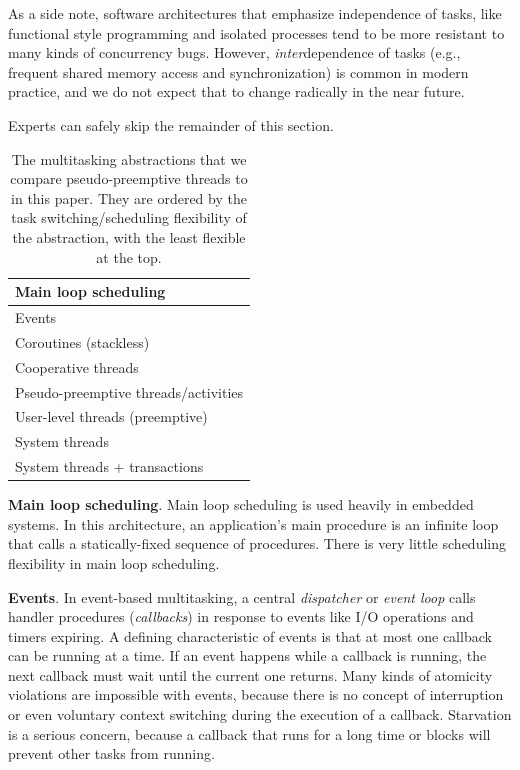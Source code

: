 \documentclass[9pt,preprint]{sigplanconf-2}
\begin{document}
As a side note, software architectures that emphasize independence of tasks, like functional style programming and isolated processes tend to be more resistant to many kinds of concurrency bugs.
However, \emph{inter}dependence of tasks (e.g., frequent shared memory access and synchronization) is common in modern practice, and we do not expect that to change radically in the near future.

Experts can safely skip the remainder of this section.

\begin{table}
  \centering
  \begin{tabular}{|l|}
    \hline
    Main loop scheduling \\
    \hline
    Events \\
    \hline
    Coroutines (stackless) \\
    \hline
    Cooperative threads \\
    \hline
    Pseudo-preemptive threads/activities \\
    \hline
    User-level threads (preemptive) \\
    \hline
    System threads \\
    \hline
    System threads + transactions \\
    \hline
  \end{tabular}
  \caption{The multitasking abstractions that we compare pseudo-preemptive threads to in this paper.
  They are ordered by the task switching/scheduling flexibility of the abstraction, with the least flexible at the top.}
  \label{table:abstractions}
\end{table}

\textbf{Main loop scheduling}.
Main loop scheduling is used heavily in embedded systems.
In this architecture, an application's main procedure is an infinite loop that calls a statically-fixed sequence of procedures.
There is very little scheduling flexibility in main loop scheduling.

\textbf{Events}.
In event-based multitasking, a central \emph{dispatcher} or \emph{event loop} calls handler procedures (\emph{callbacks}) in response to events like I/O operations and timers expiring.
A defining characteristic of events is that at most one callback can be running at a time.
If an event happens while a callback is running, the next callback must wait until the current one returns.
Many kinds of atomicity violations are impossible with events, because there is no concept of interruption or even voluntary context switching during the execution of a callback.
Starvation is a serious concern, because a callback that runs for a long time or blocks will prevent other tasks from running.
\end{document}
